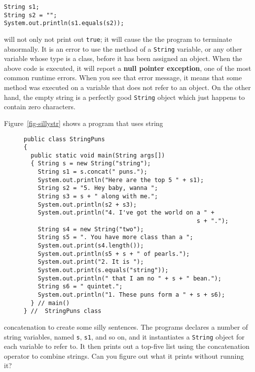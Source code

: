 \begin{jjjlisting}
\begin{lstlisting}
String s1;
String s2 = "";
System.out.println(s1.equals(s2));
\end{lstlisting}
\end{jjjlisting}

\noindent will not only not print out {\tt true}; it will cause the
the program to terminate abnormally.  It is an error to use the
method of a {\tt String} variable, or any other variable whose type is a class,
before it has been assigned an object.  
When the above code is executed, it will report a 
{\bf null pointer exception}, one of the most common runtime errors.
When you see that error message, it means that some  method was executed 
on a variable that does not refer to an object.  On the other hand, the
empty string is a perfectly good {\tt String} object which just happens 
to contain zero characters.

Figure~\ref{fig-sillystr} shows a program that uses string
\begin{figure}[h!]
\jjjprogstart
\begin{jjjlisting}
\begin{lstlisting}
public class StringPuns 
{
  public static void main(String args[]) 
  { String s = new String("string");
    String s1 = s.concat(" puns.");
    System.out.println("Here are the top 5 " + s1);
    String s2 = "5. Hey baby, wanna ";
    String s3 = s + " along with me.";
    System.out.println(s2 + s3);
    System.out.println("4. I've got the world on a " + 
                                                 s + ".");
    String s4 = new String("two");
    String s5 = ". You have more class than a ";
    System.out.print(s4.length());
    System.out.println(s5 + s + " of pearls.");
    System.out.print("2. It is ");
    System.out.print(s.equals("string"));
    System.out.println(" that I am no " + s + " bean.");
    String s6 = " quintet.";
    System.out.println("1. These puns form a " + s + s6);        
  } // main()
} //  StringPuns class
\end{lstlisting}
\end{jjjlisting}
\end{figure}
concatenation to create some silly sentences.  The programs declares a
number of string variables, named {\tt s}, {\tt s1}, and so on, and
it instantiates a {\tt String} object for each variable to refer to.
It then prints out a top-five list using the concatenation operator to
combine strings. Can you figure out what it prints without running it?



